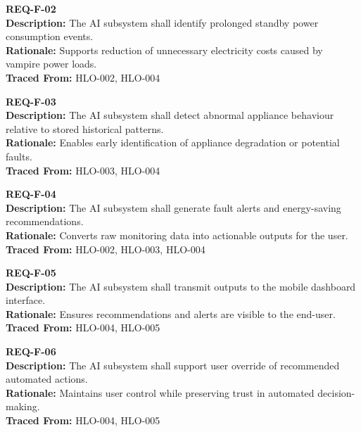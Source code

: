 \documentclass[11pt, twoside, a4paper]{article}
\begin{document}
\vspace{0.5em}

\textbf{REQ-F-02} \\
\textbf{Description:} The AI subsystem shall identify prolonged standby power consumption events. \\
\textbf{Rationale:} Supports reduction of unnecessary electricity costs caused by vampire power loads. \\
\textbf{Traced From:} HLO-002, HLO-004

\vspace{0.5em}

\textbf{REQ-F-03} \\
\textbf{Description:} The AI subsystem shall detect abnormal appliance behaviour relative to stored historical patterns. \\
\textbf{Rationale:} Enables early identification of appliance degradation or potential faults. \\
\textbf{Traced From:} HLO-003, HLO-004

\vspace{0.5em}

\textbf{REQ-F-04} \\
\textbf{Description:} The AI subsystem shall generate fault alerts and energy-saving recommendations. \\
\textbf{Rationale:} Converts raw monitoring data into actionable outputs for the user. \\
\textbf{Traced From:} HLO-002, HLO-003, HLO-004

\vspace{0.5em}

\textbf{REQ-F-05} \\
\textbf{Description:} The AI subsystem shall transmit outputs to the mobile dashboard interface. \\
\textbf{Rationale:} Ensures recommendations and alerts are visible to the end-user. \\
\textbf{Traced From:} HLO-004, HLO-005

\vspace{0.5em}

\textbf{REQ-F-06} \\
\textbf{Description:} The AI subsystem shall support user override of recommended automated actions. \\
\textbf{Rationale:} Maintains user control while preserving trust in automated decision-making. \\
\textbf{Traced From:} HLO-004, HLO-005
\end{document}
